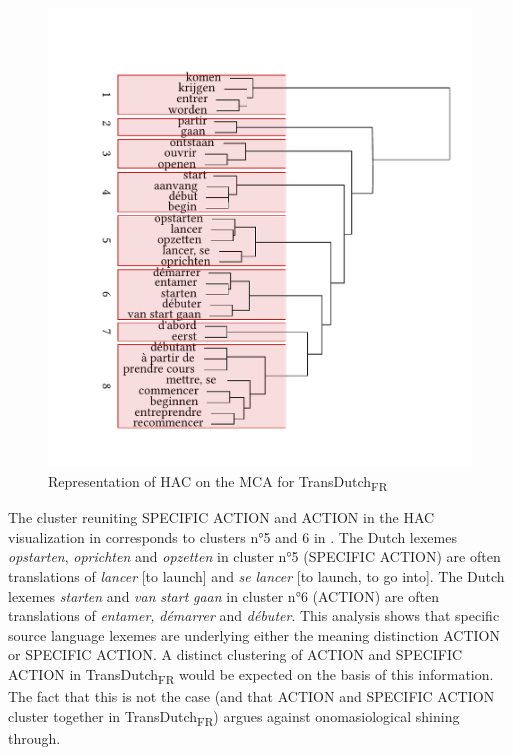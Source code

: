 \begin{figure}
\includegraphics[width=\textwidth]{figures/tree93.pdf}
\caption{\label{fig:4:90}  Representation of HAC on the MCA for TransDutch\textsubscript{FR}}
\end{figure}

The cluster reuniting {SPECIFIC} ACTION and ACTION in the HAC visualization in  corresponds to clusters n°5 and 6 in . The Dutch lexemes \textit{opstarten}, \textit{oprichten} and \textit{opzetten} in cluster n°5 ({SPECIFIC} ACTION) are often translations of \textit{lancer} [to launch] and \textit{se} \textit{lancer} [to launch, to go into]. The Dutch lexemes \textit{starten} and \textit{van} \textit{start} \textit{gaan} in cluster n°6 (ACTION) are often translations of \textit{entamer,} \textit{démarrer} and \textit{débuter}. This analysis shows that specific source language lexemes are underlying either the meaning distinction ACTION or {SPECIFIC} ACTION. A distinct clustering of ACTION and {SPECIFIC} ACTION in TransDutch\textsubscript{FR} would be expected on the basis of this information. The fact that this is not the case (and that ACTION and {SPECIFIC} ACTION cluster together in TransDutch\textsubscript{FR}) argues against onomasiological shining through.

